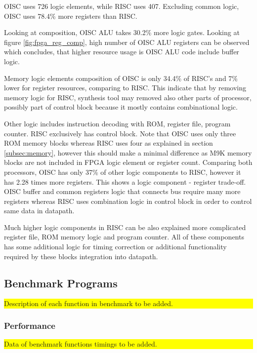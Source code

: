 OISC uses 726 logic elements, while RISC uses 407. Excluding common logic, OISC uses 78.4\% more registers than RISC.

Looking at composition, OISC ALU takes 30.2\% more logic gates. Looking at figure \ref{fig:fpga_reg_comp}, high number of OISC ALU registers can be observed which concludes, that higher resource usage is OISC ALU code include buffer logic.

Memory logic elements composition of OISC is only 34.4\% of RISC's and 7\% lower for register resources, comparing to RISC. This indicate that by removing memory logic for RISC, synthesis tool may removed also other parts of processor, possibly part of control block because it mostly contains combinational logic.

Other logic includes instruction decoding with ROM, register file, program counter. RISC exclusively has control block. Note that OISC uses  only three ROM memory blocks whereas RISC uses four as explained in section \ref{subsec:memory}, however this should make a minimal difference as M9K memory blocks are not included in FPGA logic element or register count. Comparing both processors, OISC has only 37\% of other logic components to RISC, however it has 2.28 times more registers. This shows a logic component - register trade-off. OISC buffer and common registers logic that connects bus require many more registers whereas RISC uses combination logic in control block in order to control same data in datapath. 

Much higher logic components in RISC can be also explained more complicated register file, ROM memory logic and program counter. All of these components has some additional logic for timing correction or additional functionality required by these blocks integration into datapath.

\subsection{Benchmark Programs}

\colorbox{yellow}{\parbox{\columnwidth}{Description of each function in benchmark to be added.}}

\subsubsection{Performance}
\colorbox{yellow}{\parbox{\columnwidth}{Data of benchmark functions timings to be added.}}

